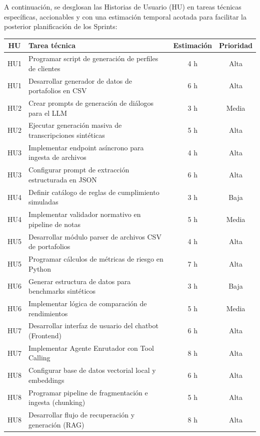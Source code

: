 \documentclass[
11pt, %
]{charter}
\begin{document}
A continuación, se desglosan las Historias de Usuario (HU) en tareas técnicas específicas, accionables y con una estimación temporal acotada para facilitar la posterior planificación de los Sprints:

\begin{table}[htpb]
\centering
\begin{tabularx}{\linewidth}{@{}|c|X|c|c|@{}}
\hline
\rowcolor[HTML]{C0C0C0}
HU & Tarea técnica & Estimación & Prioridad \\ \hline
HU1 & Programar script de generación de perfiles de clientes & 4 h & Alta \\ \hline
HU1 & Desarrollar generador de datos de portafolios en CSV & 6 h & Alta \\ \hline
HU2 & Crear prompts de generación de diálogos para el LLM & 3 h & Media \\ \hline
HU2 & Ejecutar generación masiva de transcripciones sintéticas & 5 h & Alta \\ \hline
HU3 & Implementar endpoint asíncrono para ingesta de archivos & 4 h & Alta \\ \hline
HU3 & Configurar prompt de extracción estructurada en JSON & 6 h & Alta \\ \hline
HU4 & Definir catálogo de reglas de cumplimiento simuladas & 3 h & Baja \\ \hline
HU4 & Implementar validador normativo en pipeline de notas & 5 h & Media \\ \hline
HU5 & Desarrollar módulo parser de archivos CSV de portafolios & 4 h & Alta \\ \hline
HU5 & Programar cálculos de métricas de riesgo en Python & 7 h & Alta \\ \hline
HU6 & Generar estructura de datos para benchmarks sintéticos & 3 h & Baja \\ \hline
HU6 & Implementar lógica de comparación de rendimientos & 5 h & Media \\ \hline
HU7 & Desarrollar interfaz de usuario del chatbot (Frontend) & 6 h & Alta \\ \hline
HU7 & Implementar Agente Enrutador con Tool Calling & 8 h & Alta \\ \hline
HU8 & Configurar base de datos vectorial local y embeddings & 6 h & Alta \\ \hline
HU8 & Programar pipeline de fragmentación e ingesta (chunking) & 5 h & Alta \\ \hline
HU8 & Desarrollar flujo de recuperación y generación (RAG) & 8 h & Alta \\ \hline
\end{tabularx}
\end{table}
\end{document}
